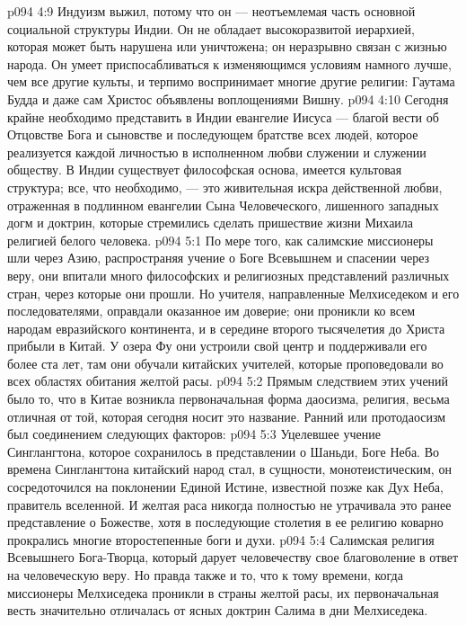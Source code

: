 \vs p094 4:9 Индуизм выжил, потому что он --- неотъемлемая часть основной социальной структуры Индии. Он не обладает высокоразвитой иерархией, которая может быть нарушена или уничтожена; он неразрывно связан с жизнью народа. Он умеет приспосабливаться к изменяющимся условиям намного лучше, чем все другие культы, и терпимо воспринимает многие другие религии: Гаутама Будда и даже сам Христос объявлены воплощениями Вишну.
\vs p094 4:10 Сегодня крайне необходимо представить в Индии евангелие Иисуса --- благой вести об Отцовстве Бога и сыновстве и последующем братстве всех людей, которое реализуется каждой личностью в исполненном любви служении и служении обществу. В Индии существует философская основа, имеется культовая структура; все, что необходимо, --- это живительная искра действенной любви, отраженная в подлинном евангелии Сына Человеческого, лишенного западных догм и доктрин, которые стремились сделать пришествие жизни Михаила религией белого человека.
\vs p094 5:1 По мере того, как салимские миссионеры шли через Азию, распространяя учение о Боге Всевышнем и спасении через веру, они впитали много философских и религиозных представлений различных стран, через которые они прошли. Но учителя, направленные Мелхиседеком и его последователями, оправдали оказанное им доверие; они проникли ко всем народам евразийского континента, и в середине второго тысячелетия до Христа прибыли в Китай. У озера Фу они устроили свой центр и поддерживали его более ста лет, там они обучали китайских учителей, которые проповедовали во всех областях обитания желтой расы.
\vs p094 5:2 Прямым следствием этих учений было то, что в Китае возникла первоначальная форма даосизма, религия, весьма отличная от той, которая сегодня носит это название. Ранний или протодаосизм был соединением следующих факторов:
\vs p094 5:3 \bibnobreakspace Уцелевшее учение Синглангтона, которое сохранилось в представлении о Шаньди, Боге Неба. Во времена Синглангтона китайский народ стал, в сущности, монотеистическим, он сосредоточился на поклонении Единой Истине, известной позже как Дух Неба, правитель вселенной. И желтая раса никогда полностью не утрачивала это ранее представление о Божестве, хотя в последующие столетия в ее религию коварно прокрались многие второстепенные боги и духи.
\vs p094 5:4 \pc {}\bibnobreakspace Салимская религия Всевышнего Бога\hyp{}Творца, который дарует человечеству свое благоволение в ответ на человеческую веру. Но правда также и то, что к тому времени, когда миссионеры Мелхиседека проникли в страны желтой расы, их первоначальная весть значительно отличалась от ясных доктрин Салима в дни Мелхиседека.
